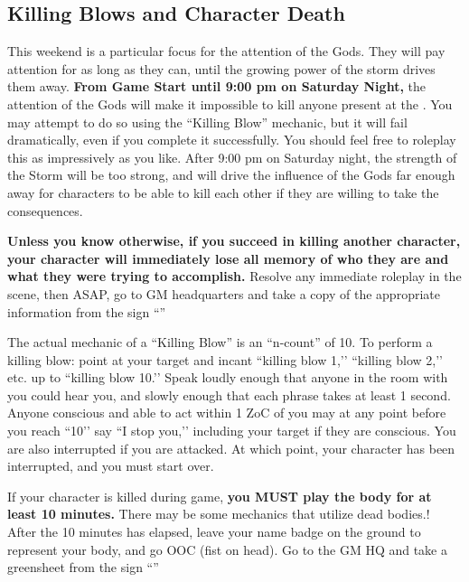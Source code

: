 \documentclass[sheet]{GL2020}
\begin{document}
\subsection{Killing Blows and Character Death}

This weekend is a particular focus for the attention of the Gods. They will pay attention for as long as they can, until the growing power of the storm drives them away. \textbf{From Game Start until 9:00 pm on Saturday Night,} the attention of the Gods will make it impossible to kill anyone present at the \pSc{}. You may attempt to do so using the ``Killing Blow'' mechanic, but it will fail dramatically, even if you complete it successfully. You should feel free to roleplay this as impressively as you like. After 9:00 pm on Saturday night, the strength of the Storm will be too strong, and will drive the influence of the Gods far enough away for characters to be able to kill each other if they are willing to take the consequences.


\textbf{Unless you know otherwise, if you succeed in killing another character, your character will immediately lose all memory of who they are and what they were trying to accomplish.} Resolve any immediate roleplay in the scene, then ASAP, go to GM headquarters and take a copy of the appropriate information from the sign ``\sMurderConsequences{}''

The actual mechanic of a ``Killing Blow'' is an ``n-count'' of 10. To perform a killing blow: point at your target and incant ``killing blow 1,'’ ``killing blow 2,'’ etc. up to ``killing blow 10.'’ Speak loudly enough that anyone in the room with you could hear you, and slowly enough that each phrase takes at least 1 second. Anyone conscious and able to act within 1 ZoC of you may at any point before you reach ``10'’ say ``I stop you,'’ including your target if they are conscious. You are also interrupted if you are attacked. At which point, your character has been interrupted, and you must start over.

If your character is killed during game, \textbf{you MUST play the body for at least 10 minutes.} There may be some mechanics that utilize dead bodies.! After the 10 minutes has elapsed, leave your name badge on the ground to represent your body, and go OOC (fist on head). Go to the GM HQ and take a greensheet from the sign ``\sMurdered{}''
\end{document}
